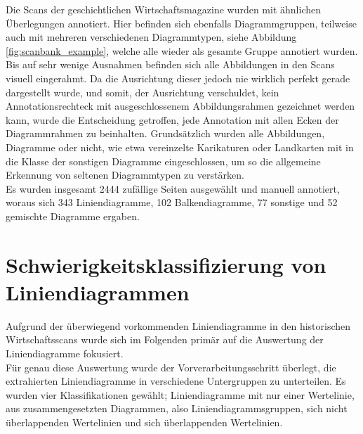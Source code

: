Die Scans der geschichtlichen Wirtschaftsmagazine wurden mit ähnlichen Überlegungen annotiert. Hier befinden sich ebenfalls Diagrammgruppen, teilweise auch mit mehreren verschiedenen Diagrammtypen, siehe Abbildung \ref{fig:scanbank_example}, welche alle wieder als gesamte Gruppe annotiert wurden. Bis auf sehr wenige Ausnahmen befinden sich alle Abbildungen in den Scans visuell eingerahmt. Da die Ausrichtung dieser jedoch nie wirklich perfekt gerade dargestellt wurde, und somit, der Ausrichtung verschuldet, kein Annotationsrechteck mit ausgeschlossenem Abbildungsrahmen gezeichnet werden kann, wurde die Entscheidung getroffen, jede Annotation mit allen Ecken der Diagrammrahmen zu beinhalten. Grundsätzlich wurden alle Abbildungen, Diagramme oder nicht, wie etwa vereinzelte Karikaturen oder Landkarten mit in die Klasse der sonstigen Diagramme eingeschlossen, um so die allgemeine Erkennung von seltenen Diagrammtypen zu verstärken.
\\
Es wurden insgesamt 2444 zufällige Seiten ausgewählt und manuell annotiert, woraus sich 343 Liniendiagramme, 102 Balkendiagramme, 77 sonstige und 52 gemischte Diagramme ergaben.

\clearpage
\section{Schwierigkeitsklassifizierung von Liniendiagrammen}
\label{ch:linebank}

Aufgrund der überwiegend vorkommenden Liniendiagramme in den historischen Wirtschaftsscans wurde sich im Folgenden primär auf die Auswertung der Liniendiagramme fokusiert.
\\
Für genau diese Auswertung wurde der Vorverarbeitungsschritt überlegt, die extrahierten Liniendiagramme in verschiedene Untergruppen zu unterteilen. Es wurden vier Klassifikationen gewählt; Liniendiagramme mit nur einer Wertelinie, aus zusammengesetzten Diagrammen, also Liniendiagrammsgruppen, sich nicht überlappenden Wertelinien und sich überlappenden Wertelinien.

